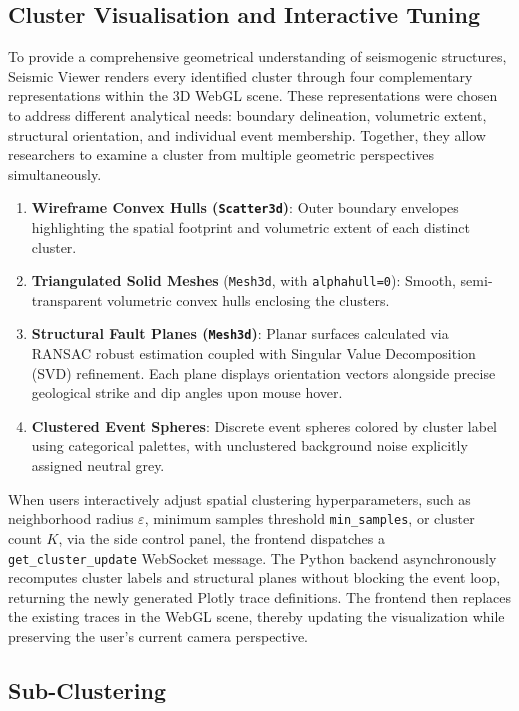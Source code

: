 \subsection{Cluster Visualisation and Interactive Tuning}

To provide a comprehensive geometrical understanding of seismogenic structures, Seismic Viewer renders every identified cluster through four complementary representations within the 3D WebGL scene. These representations were chosen to address different analytical needs: boundary delineation, volumetric extent, structural orientation, and individual event membership. Together, they allow researchers to examine a cluster from multiple geometric perspectives simultaneously.
\begin{enumerate}
    \item \textbf{Wireframe Convex Hulls (\texttt{Scatter3d})}: Outer boundary envelopes highlighting the spatial footprint and volumetric extent of each distinct cluster.
    \item \textbf{Triangulated Solid Meshes} (\texttt{Mesh3d}, with \texttt{alphahull=0}): Smooth, semi-transparent volumetric convex hulls enclosing the clusters.
    \item \textbf{Structural Fault Planes (\texttt{Mesh3d})}: Planar surfaces calculated via RANSAC robust estimation coupled with Singular Value Decomposition (SVD) refinement. Each plane displays orientation vectors alongside precise geological strike and dip angles upon mouse hover.
    \item \textbf{Clustered Event Spheres}: Discrete event spheres colored by cluster label using categorical palettes, with unclustered background noise explicitly assigned neutral grey.
\end{enumerate}
When users interactively adjust spatial clustering hyperparameters, such as neighborhood radius $\varepsilon$, minimum samples threshold \texttt{min\_samples}, or cluster count $K$, via the side control panel, the frontend dispatches a \texttt{get\_cluster\_update} WebSocket message. The Python backend asynchronously recomputes cluster labels and structural planes without blocking the event loop, returning the newly generated Plotly trace definitions. The frontend then replaces the existing traces in the WebGL scene, thereby updating the visualization while preserving the user's current camera perspective.

\subsection{Sub-Clustering}
\label{sec:sub-clustering}

